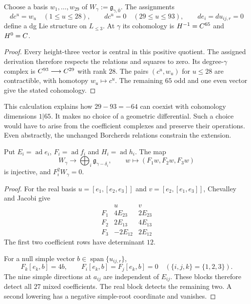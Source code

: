 \begin{proposition}
\label{prop:bkm-height-three-differential}
Choose a basis $w_1,\ldots,w_{29}$ of
$W_\gamma:=\mathfrak g_{\gamma,\overline0}$.
The assignments
\[
 dc^u=w_u\quad(1\leq u\leq28),\qquad
 dc^u=0\quad(29\leq u\leq93),\qquad de_i=du_{ij,r}=0
\]
define a dg Lie structure on $L_{\leq3}$. At $\gamma$ its
cohomology is $H^{-1}=C^{65}$ and $H^0=C$.
\end{proposition}
\begin{proof}
Every height-three vector is central in this positive quotient.
The assigned derivation therefore respects the relations and
squares to zero. Its degree-$\gamma$ complex is
$C^{93}\longrightarrow C^{29}$ with rank $28$.
The pairs $(c^u,w_u)$ for $u\leq28$ are contractible, with homotopy
$w_u\mapsto c^u$. The remaining $65$ odd and one even vector give
the stated cohomology.
\end{proof}

This calculation explains how $29-93=-64$ can coexist with
cohomology dimensions $1|65$. It makes no choice of a geometric
differential. Such a choice would have to arise from the coefficient
complexes and preserve their operations. Even abstractly, the
unchanged Borcherds relations constrain the extension.

\begin{lemma}
\label{lem:bkm-lowering-detector}
Put $E_i=\operatorname{ad}e_i$, $F_i=\operatorname{ad}f_i$ and
$H_i=\operatorname{ad}h_i$. The map
\[
 W_\gamma\longrightarrow\bigoplus_i\mathfrak g_{\gamma-\delta_i},
 \qquad w\longmapsto(F_1w,F_2w,F_3w)
\]
is injective, and $F_i^2W_\gamma=0$.
\end{lemma}
\begin{proof}
For the real basis $u=[e_1,[e_2,e_3]]$ and
$v=[e_2,[e_1,e_3]]$, Chevalley and Jacobi give
\[
\begin{array}{c|cc}
 &u&v\\\hline
 F_1&4E_{23}&2E_{23}\\
 F_2&2E_{13}&4E_{13}\\
 F_3&-2E_{12}&2E_{12}
\end{array}
\]
The first two coefficient rows have determinant $12$.

For a null simple vector $b\in\operatorname{span}\{u_{ij,r}\}$,
\[
 F_k[e_k,b]=4b,\qquad F_i[e_k,b]=F_j[e_k,b]=0
 \quad(\{i,j,k\}=\{1,2,3\}).
\]
The nine simple directions at $a_{ij}$ are independent of $E_{ij}$.
These blocks therefore detect all $27$ mixed coefficients. The real
block detects the remaining two. A second lowering has a negative
simple-root coordinate and vanishes.
\end{proof}

